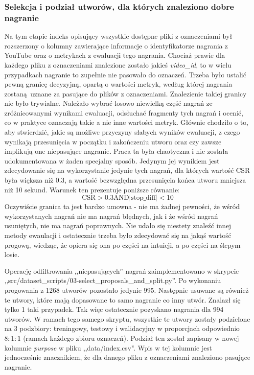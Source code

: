\subsubsection{Selekcja i podział utworów, dla których znaleziono dobre nagranie}
Na tym etapie indeks opisujący wszystkie dostępne pliki z oznaczeniami był rozszerzony o kolumny
zawierające informacje o identyfikatorze nagrania z YouTube oraz o metrykach z ewaluacji tego
nagrania. Chociaż prawie dla każdego pliku z oznaczeniami znalezione zostało jakieś
\emph{video\_id}, to w wielu przypadkach nagranie to zupełnie nie pasowało do oznaczeń. Trzeba było
ustalić pewną granicę decyzyjną, opartą o wartości metryk, według której nagrania zostaną uznane za
pasujące do plików z oznaczeniami. Znalezienie takiej granicy nie było trywialne. Należało wybrać
losowo niewielką część nagrań ze zróżnicowanymi wynikami ewaluacji, odsłuchać fragmenty tych nagrań
i ocenić, co w praktyce oznaczają takie a nie inne wartości metryk. Głównie chodziło o to, aby
stwierdzić, jakie są możliwe przyczyny słabych wyników ewaluacji, z czego wynikają przesunięcia w
początku i zakończeniu utworu oraz czy zawsze implikują one niepasujące nagranie. Praca ta była
chaotyczna i nie została udokumentowana w żaden specjalny sposób. Jedynym jej wynikiem jest
zdecydowanie się na wykorzystanie jedynie tych nagrań, dla których wartość CSR była większa niż
0.3, a wartość bezwzględna przesunięcia końca utworu mniejsza niż 10 sekund. Warunek ten prezentuje
poniższe równanie:
\begin{equation}
    \textrm{CSR} > 0.3 \textrm{AND} |\textrm{stop\_diff}| < 10
\end{equation}
Oczywiście granica ta jest bardzo umowna - nie ma żadnej pewności, że wśród wykorzystanych nagrań
nie ma nagrań błędnych, jak i że wśród nagrań usuniętych, nie ma nagrań poprawnych. Nie udało się
niestety znaleźć innej metody ewaulacji i ostatecznie trzeba było zdecydować się na jakąś wartość
progową, wiedząc, że opiera się ona po części na intuicji, a po części na ślepym losie.

Operację odfiltrowania ,,niepasujących'' nagrań zaimplementowano w skrypcie
,,src/dataset_scripts/03-select\_proposals\_and\_split.py''. Po wykonaniu progowania z 1268 utworów
pozostało jedynie 995. Następnie usuwane są również te utwory, które mają dopasowane to samo
nagranie co inny utwór. Znalazł się tylko 1 taki przypadek. Tak więc ostatecznie pozyskano nagrania
dla 994 utworów. W ramach tego samego skryptu, wszystkie te utwory zostały podzielone na 3
podzbiory: treningowy, testowy i walidacyjny w proporcjach odpowiednio $8:1:1$ (ramach każdego
zbioru oznaczeń). Podział ten został zapisany w nowej kolumnie \emph{purpose} w pliku
,,data/index.csv''. Wpis w tej kolumnie jest jednocześnie znacznikiem, że dla danego pliku z
oznaczeniami znaleziono pasujące nagranie.

